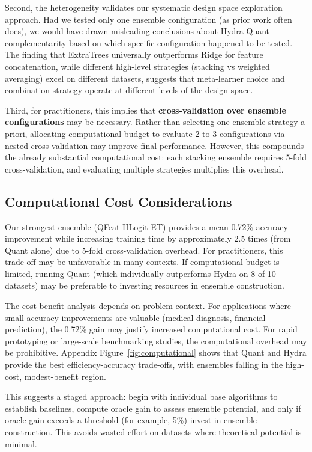 \documentclass[pdflatex,sn-basic]{sn-jnl}           %
\theoremstyle{thmstyleone}%
\theoremstyle{thmstyletwo}%
\theoremstyle{thmstylethree}%
\begin{document}
Second, the heterogeneity validates our systematic design space exploration approach. Had we tested only one ensemble configuration (as prior work often does), we would have drawn misleading conclusions about Hydra-Quant complementarity based on which specific configuration happened to be tested. The finding that ExtraTrees universally outperforms Ridge for feature concatenation, while different high-level strategies (stacking vs weighted averaging) excel on different datasets, suggests that meta-learner choice and combination strategy operate at different levels of the design space.

Third, for practitioners, this implies that \textbf{cross-validation over ensemble configurations} may be necessary. Rather than selecting one ensemble strategy a priori, allocating computational budget to evaluate 2 to 3 configurations via nested cross-validation may improve final performance. However, this compounds the already substantial computational cost: each stacking ensemble requires 5-fold cross-validation, and evaluating multiple strategies multiplies this overhead.

\subsection{Computational Cost Considerations}

Our strongest ensemble (QFeat-HLogit-ET) provides a mean 0.72\% accuracy improvement while increasing training time by approximately 2.5 times (from Quant alone) due to 5-fold cross-validation overhead. For practitioners, this trade-off may be unfavorable in many contexts. If computational budget is limited, running Quant (which individually outperforms Hydra on 8 of 10 datasets) may be preferable to investing resources in ensemble construction.

The cost-benefit analysis depends on problem context. For applications where small accuracy improvements are valuable (medical diagnosis, financial prediction), the 0.72\% gain may justify increased computational cost. For rapid prototyping or large-scale benchmarking studies, the computational overhead may be prohibitive. Appendix Figure~\ref{fig:computational} shows that Quant and Hydra provide the best efficiency-accuracy trade-offs, with ensembles falling in the high-cost, modest-benefit region.

This suggests a staged approach: begin with individual base algorithms to establish baselines, compute oracle gain to assess ensemble potential, and only if oracle gain exceeds a threshold (for example, 5\%) invest in ensemble construction. This avoids wasted effort on datasets where theoretical potential is minimal.
\end{document}
